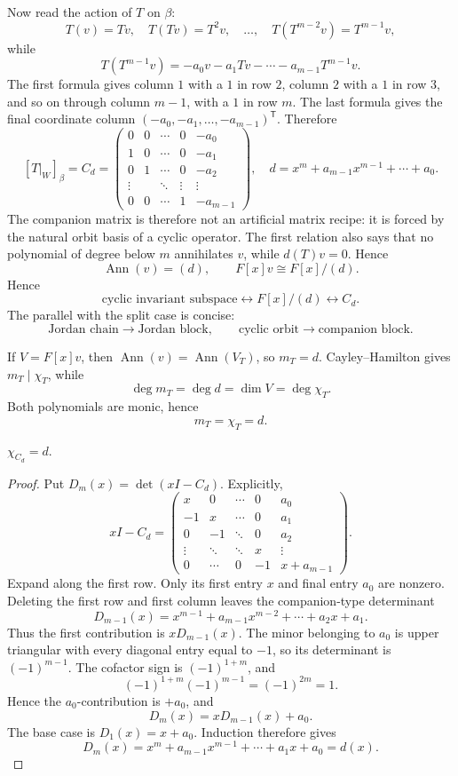 Now read the action of \(T\) on \(\beta\):
\[
T(v)=Tv,\quad T(Tv)=T^2v,\quad\ldots,\quad
T(T^{m-2}v)=T^{m-1}v,
\]
while
\[
T(T^{m-1}v)
=-a_0v-a_1Tv-\cdots-a_{m-1}T^{m-1}v.
\]
The first formula gives column \(1\) with a \(1\) in row \(2\), column \(2\)
with a \(1\) in row \(3\), and so on through column \(m-1\), with a \(1\)
in row \(m\). The last formula gives the final coordinate column
\((-a_0,-a_1,\ldots,-a_{m-1})^{\mathsf T}\). Therefore
\[
[T|_W]_\beta=C_d=
\begin{pmatrix}
0&0&\cdots&0&-a_0\\
1&0&\cdots&0&-a_1\\
0&1&\cdots&0&-a_2\\
\vdots&&\ddots&\vdots&\vdots\\
0&0&\cdots&1&-a_{m-1}
\end{pmatrix},
\quad d=x^m+a_{m-1}x^{m-1}+\cdots+a_0.
\]
The companion matrix is therefore not an artificial matrix recipe: it is
forced by the natural orbit basis of a cyclic operator. The first relation
also says that no polynomial of degree below \(m\) annihilates \(v\), while
\(d(T)v=0\). Hence
\[
\operatorname{Ann}(v)=(d),\qquad F[x]v\cong F[x]/(d).
\]
Hence
\[
\boxed{\text{cyclic invariant subspace}\longleftrightarrow
F[x]/(d)\longleftrightarrow C_d}.
\]
The parallel with the split case is concise:
\[
\text{Jordan chain}\longrightarrow\text{Jordan block},
\qquad
\text{cyclic orbit}\longrightarrow\text{companion block}.
\]

If \(V=F[x]v\), then \(\operatorname{Ann}(v)=\operatorname{Ann}(V_T)\), so
\(m_T=d\). Cayley--Hamilton gives \(m_T\mid\chi_T\), while
\[
\deg m_T=\deg d=\dim V=\deg\chi_T.
\]
Both polynomials are monic, hence
\[
m_T=\chi_T=d.
\]

\begin{theorem}
\label{thm:companion-characteristic}
\(\chi_{C_d}=d\).
\end{theorem}
\begin{proof}
Put \(D_m(x)=\det(xI-C_d)\). Explicitly,
\[
xI-C_d=
\begin{pmatrix}
x&0&\cdots&0&a_0\\
-1&x&\cdots&0&a_1\\
0&-1&\ddots&0&a_2\\
\vdots&\ddots&\ddots&x&\vdots\\
0&\cdots&0&-1&x+a_{m-1}
\end{pmatrix}.
\]
Expand along the first row. Only its first entry \(x\) and final entry
\(a_0\) are nonzero. Deleting the first row and first column leaves the
companion-type determinant
\[
D_{m-1}(x)
=x^{m-1}+a_{m-1}x^{m-2}+\cdots+a_2x+a_1.
\]
Thus the first contribution is \(xD_{m-1}(x)\). The minor belonging to
\(a_0\) is upper triangular with every diagonal entry equal to \(-1\), so
its determinant is \((-1)^{m-1}\). The cofactor sign is
\((-1)^{1+m}\), and
\[
(-1)^{1+m}(-1)^{m-1}=(-1)^{2m}=1.
\]
Hence the \(a_0\)-contribution is \(+a_0\), and
\[
D_m(x)=xD_{m-1}(x)+a_0.
\]
The base case is \(D_1(x)=x+a_0\). Induction therefore gives
\[
D_m(x)=x^m+a_{m-1}x^{m-1}+\cdots+a_1x+a_0=d(x).
\]
\end{proof}

